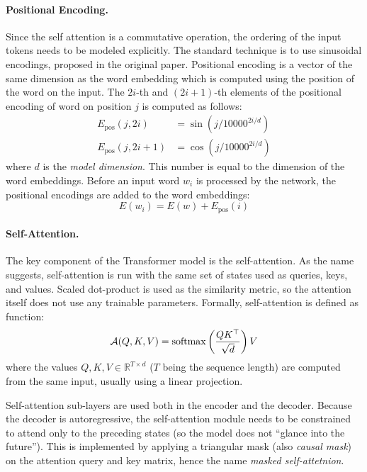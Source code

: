 \paragraph{Positional Encoding.} Since the self attention is a commutative
operation, the ordering of the input tokens needs to be modeled explicitly.
The standard technique is to use sinusoidal encodings, proposed in the original
paper. Positional encoding is a vector of the same dimension as the word
embedding which is computed using the position of the word on the input.
The $2i$-th and $(2i+1)$-th elements of the positional encoding of word on
position $j$ is computed as follows:
%
\begin{equation}
  \begin{split}
    E_{\text{pos}}(j, 2i) &= \sin(j / 10000^{2i/d}) \\
    E_{\text{pos}}(j, 2i + 1) &= \cos(j / 10000^{2i/d})
  \end{split}
\end{equation}
%
where $d$ is the \emph{model dimension}. This number is equal to the dimension
of the word embeddings. Before an input word $w_i$ is processed by the network,
the positional encodings are added to the word embeddings:
\begin{equation}
  E(w_i) = E(w) + E_{\text{pos}}(i)
\end{equation}

\paragraph{Self-Attention.} The key component of the Transformer model is the
self-attention. As the name suggests, self-attention is run with the same set
of states used as queries, keys, and values. Scaled dot-product is used as the
similarity metric, so the attention itself does not use any trainable
parameters. Formally, self-attention is defined as function:
%
\begin{equation}
  \mathcal{A}(Q,K,V) = \operatorname*{softmax} \left( \frac{QK^\top}{\sqrt{d}} \right) V
  \label{eq:scaled-dot-product}
\end{equation}
%
where the values $Q, K, V \in \mathbb{R}^{T \times d}$ ($T$ being the sequence
length) are computed from the same input, usually using a linear projection.

Self-attention sub-layers are used both in the encoder and the decoder. Because
the decoder is autoregressive, the self-attention module needs to be
constrained to attend only to the preceding states (so the model does not
``glance into the future''). This is implemented by applying a triangular mask
(also \emph{causal mask}) on the attention query and key matrix, hence the name
\emph{masked self-attetnion}.

